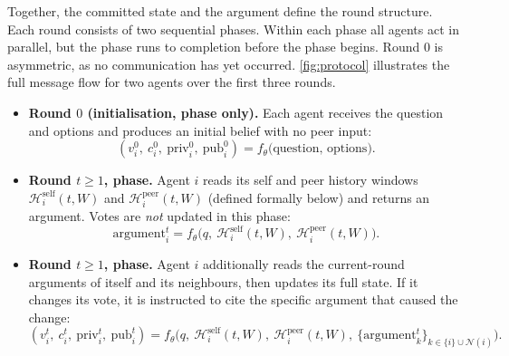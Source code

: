 Together, the committed state and the argument define the round structure.
Each round consists of two sequential phases. Within each phase all agents act in
parallel, but the \arguephase{} phase runs to completion before the \updatephase{} phase begins.
Round $0$ is asymmetric, as no communication has yet occurred. \autoref{fig:protocol} illustrates the full message flow for two agents over the
first three rounds.

\begin{itemize}
  \item \textbf{Round $0$ (initialisation, \updatephase{} phase only).} Each agent receives
        the question and options and produces an initial belief with no peer
        input:
        \[
          (v_i^{0},\ c_i^{0},\ \text{priv}_i^{0},\ \text{pub}_i^{0})
          = f_\theta\big(\text{question, options}\big).
        \]

  \item \textbf{Round $t \geq 1$, \arguephase{} phase.} Agent $i$ reads its self
        and peer history windows $\mathcal{H}^{\text{self}}_i(t,W)$ and
        $\mathcal{H}^{\text{peer}}_i(t,W)$ (defined formally below)
        and returns an argument. Votes are \emph{not} updated in this phase:
        \[
          \text{argument}_i^{t}
          = f_\theta\big(q,\ \mathcal{H}^{\text{self}}_i(t,W),\ \mathcal{H}^{\text{peer}}_i(t,W)\big).
        \]

  \item \textbf{Round $t \geq 1$, \updatephase{} phase.} Agent $i$ additionally
        reads the current-round arguments of itself and its neighbours, then updates its
        full state. If it changes its vote, it is instructed to cite the specific
        argument that caused the change:
        \[
          (v_i^{t},\ c_i^{t},\ \text{priv}_i^{t},\ \text{pub}_i^{t})
          = f_\theta\big(q,\ \mathcal{H}^{\text{self}}_i(t,W),\ \mathcal{H}^{\text{peer}}_i(t,W),\
          \{\text{argument}_k^{t}\}_{k \in \{i\} \cup \mathcal{N}(i)}\big).
        \]
\end{itemize}

